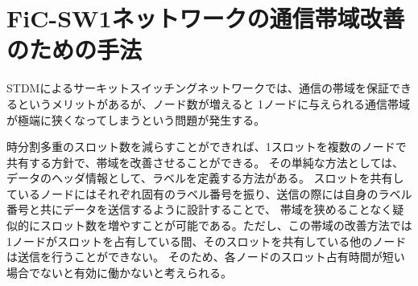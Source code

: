 \section{FiC-SW1ネットワークの通信帯域改善のための手法}
STDMによるサーキットスイッチングネットワークでは、通信の帯域を保証できるというメリットがあるが、ノード数が増えると
1ノードに与えられる通信帯域が極端に狭くなってしまうという問題が発生する。

時分割多重のスロット数を減らすことができれば、1スロットを複数のノードで共有する方針で、帯域を改善させることができる。
その単純な方法としては、データのヘッダ情報として、ラベルを定義する方法がある。
スロットを共有しているノードにはそれぞれ固有のラベル番号を振り、送信の際には自身のラベル番号と共にデータを送信するように設計することで、
帯域を狭めることなく疑似的にスロット数を増やすことが可能である。ただし、この帯域の改善方法では
1ノードがスロットを占有している間、そのスロットを共有している他のノードは送信を行うことができない。
そのため、各ノードのスロット占有時間が短い場合でないと有効に働かないと考えられる。
